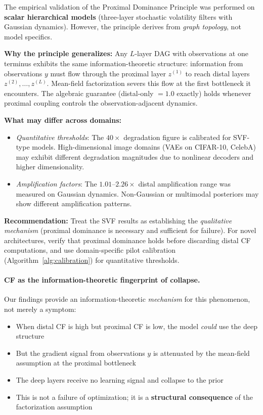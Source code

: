 \documentclass[10pt]{article} %
\theoremstyle{plain}
\theoremstyle{definition}
\begin{document}
\begin{tcolorbox}[breakable, colback=gray!5, colframe=black!75, title=\textbf{Empirical Scope and Topological Generality}, fonttitle=\bfseries]
The empirical validation of the Proximal Dominance Principle was performed on \textbf{scalar hierarchical models} (three-layer stochastic volatility filters with Gaussian dynamics). However, the principle derives from \emph{graph topology}, not model specifics.

\textbf{Why the principle generalizes:} Any $L$-layer DAG with observations at one terminus exhibits the same information-theoretic structure: information from observations $y$ must flow through the proximal layer $z^{(1)}$ to reach distal layers $z^{(2)}, \ldots, z^{(L)}$. Mean-field factorization severs this flow at the first bottleneck it encounters. The algebraic guarantee (distal-only $= 1.0$ exactly) holds whenever proximal coupling controls the observation-adjacent dynamics.

\textbf{What may differ across domains:}
\begin{itemize}
    \item \emph{Quantitative thresholds}: The $40\times$ degradation figure is calibrated for SVF-type models. High-dimensional image domains (VAEs on CIFAR-10, CelebA) may exhibit different degradation magnitudes due to nonlinear decoders and higher dimensionality.
    \item \emph{Amplification factors}: The $1.01$--$2.26\times$ distal amplification range was measured on Gaussian dynamics. Non-Gaussian or multimodal posteriors may show different amplification patterns.
\end{itemize}

\textbf{Recommendation:} Treat the SVF results as establishing the \emph{qualitative mechanism} (proximal dominance is necessary and sufficient for failure). For novel architectures, verify that proximal dominance holds before discarding distal CF computations, and use domain-specific pilot calibration (Algorithm~\ref{alg:calibration}) for quantitative thresholds.
\end{tcolorbox}

\paragraph{CF as the information-theoretic fingerprint of collapse.} Our findings provide an information-theoretic \emph{mechanism} for this phenomenon, not merely a symptom:
\begin{itemize}
    \item When distal CF is high but proximal CF is low, the model \emph{could} use the deep structure
    \item But the gradient signal from observations $y$ is attenuated by the mean-field assumption at the proximal bottleneck
    \item The deep layers receive no learning signal and collapse to the prior
    \item This is not a failure of optimization; it is a \textbf{structural consequence} of the factorization assumption
\end{itemize}
\end{document}
